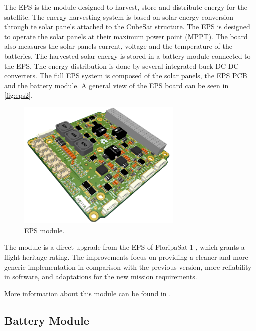 The EPS is the module designed to harvest, store and distribute energy for the satellite. The energy harvesting system is based on solar energy conversion through te solar panels attached to the CubeSat structure. The EPS is designed to operate the solar panels at their maximum power point (MPPT). The board also measures the solar panels current, voltage and the temperature of the batteries. The harvested solar energy is stored in a battery module connected to the EPS. The energy distribution is done by several integrated buck DC-DC converters. The full EPS system is composed of the solar panels, the EPS PCB and the battery module. A general view of the EPS board can be seen in \autoref{fig:eps2}.

\begin{figure}[!ht]
    \begin{center}
        \includegraphics[width=0.7\textwidth]{figures/eps2-pcb-3d}
        \caption{EPS module.}
        \label{fig:eps2}
    \end{center}
\end{figure}

The module is a direct upgrade from the EPS of FloripaSat-1 \cite{floripasat}, which grants a flight heritage rating. The improvements focus on providing a cleaner and more generic implementation in comparison with the previous version, more reliability in software, and adaptations for the new mission requirements.

More information about this module can be found in \cite{eps2}.

\subsection{Battery Module}

